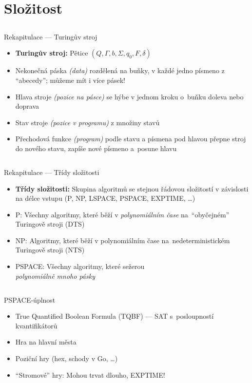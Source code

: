 \documentclass{beamer}
\begin{document}
\section{Složitost}

\subsection{}
\begin{frame}{Rekapitulace --- Turingův stroj}
\begin{itemize}
\item {\bf Turingův stroj:} Pětice $(Q, \Gamma, b, \Sigma, q_0, F, \delta)$
\item Nekonečná páska {\em (data)} rozdělená na buňky, v každé jedno písmeno z ``abecedy'';
	můžeme mít i více pásek!
\item Hlava stroje {\em (pozice na pásce)} se hýbe v jednom kroku o~buňku doleva nebo doprava
\item Stav stroje {\em (pozice v programu)} z množiny stavů
\item Přechodová funkce {\em (program)} podle stavu a písmena pod hlavou přepne stroj do nového stavu, zapíše nové písmeno a~posune hlavu
\end{itemize}
\end{frame}

\subsection{}
\begin{frame}{Rekapitulace --- Třídy složitosti}
\begin{itemize}
\item {\bf Třídy složitosti:} Skupina algoritmů se stejnou řádovou složitostí v závislosti na délce vstupu (P, NP, LSPACE, PSPACE, EXPTIME, \dots)
\item P: Všechny algoritmy, které běží v {\em polynomiálním čase} na~``obyčejném'' Turingově stroji (DTS)
\item NP: Algoritmy, které běží v polynomiálním čase na~nedeterministickém Turingově stroji (NTS)
\item PSPACE: Všechny algoritmy, které sežerou \\ {\em polynomiálně mnoho pásky}
\end{itemize}
\end{frame}

\subsection{}
\begin{frame}{PSPACE-úplnost}
\begin{itemize}
\item True Quantified Boolean Formula (TQBF) --- SAT s~posloupností kvantifikátorů
\item Hra na hlavní města
\item Poziční hry (hex, schody v Go, \dots)
\item ``Stromové'' hry: Mohou trvat dlouho, EXPTIME!
\end{itemize}
\end{frame}
\end{document}
